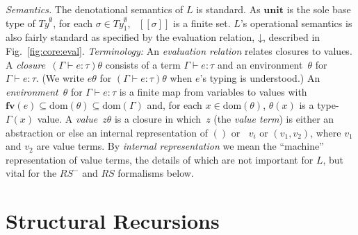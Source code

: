 \documentclass[envcountsame]{llncs}
\newcommand{\Unit}{\ensuremath{\mathbf{unit}}\xspace}
\newcommand{\Ty}{\mathit{Ty}}
\newcommand{\inj}{\mathop{\iota}\nolimits}
\newcommand{\dom}{\mathrm{dom}}
\newcommand{\entails}{\vdash}
\newcommand{\fv}{\ensuremath{\mathbf{fv}}}
\newcommand{\yields}{\mathbin{\downarrow}}
\newcommand{\of}{\colon}
\renewcommand{\colon}{\mathpunct{:}}
\newcommand{\semantics}[1]{\ensuremath{[\![ #1 ]\!]}}
\begin{document}
\emph{Semantics.} 
The denotational semantics of $L$ is standard.  As $\Unit$ is the
sole base type of $\Ty^\emptyset$, for each
$\sigma\in\Ty_1^\emptyset$, \ $\semantics{\sigma}$ is a finite set.
$L$'s operational semantics is also fairly standard as specified by
the evaluation relation, $\yields$, described in
Fig.~\ref{fig:core:eval}.  \emph{Terminology:} An \emph{evaluation
  relation} relates closures to values.  A
\emph{closure}~$(\Gamma\entails e\of\tau)\theta$ consists of a term
$\Gamma\entails e\of\tau$ and an environment~$\theta$ for
$\Gamma\entails e\of\tau$.  (We write $e\theta$ for $(\Gamma\entails
e\of\tau)\theta$ when $e$'s typing is understood.)  An
\emph{environment}~$\theta$ for $\Gamma\entails e\of\tau$ is a
finite map from variables to values with
$\fv(e)\subseteq\dom(\theta)\subseteq\dom(\Gamma)$ and, for each
$x\in\dom(\theta)$, $\theta(x)$ is a type-$\Gamma(x)$ value.
A \emph{value}~$z\theta$ is a closure in which~$z$ (the \emph{value
  term}) is either an abstraction or else an internal representation
of $()$ or $\mathop{\inj_i} v_i$ or $(v_1,v_2)$, where $v_1$ and
$v_2$ are value terms.  By \emph{internal representation} we mean
the ``machine'' representation of value terms, the details of which
are not important for $L$, but vital for the $RS^-$ and $RS$
formalisms below.  

\section{Structural Recursions} 	
\end{document}
